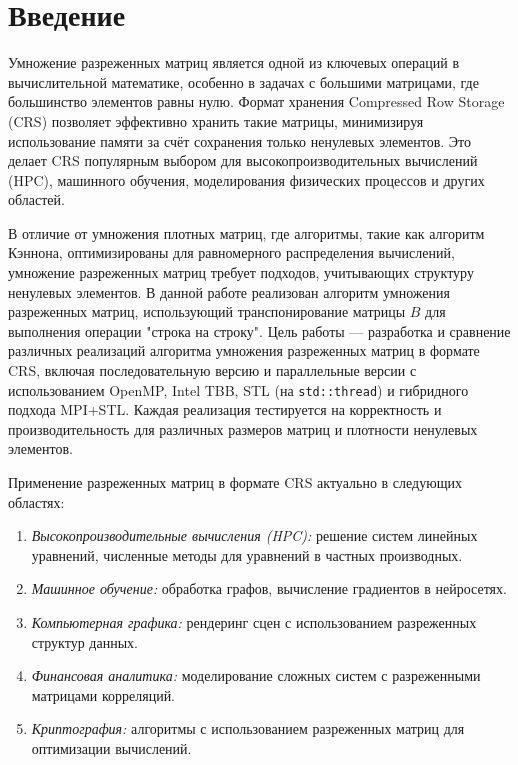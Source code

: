 \documentclass[a4paper,12pt]{article}
\begin{document}
\tableofcontents
\newpage

\section{Введение}
Умножение разреженных матриц является одной из ключевых операций в вычислительной математике, особенно в задачах с большими матрицами, где большинство элементов равны нулю. Формат хранения Compressed Row Storage (CRS) позволяет эффективно хранить такие матрицы, минимизируя использование памяти за счёт сохранения только ненулевых элементов. Это делает CRS популярным выбором для высокопроизводительных вычислений (HPC), машинного обучения, моделирования физических процессов и других областей.

В отличие от умножения плотных матриц, где алгоритмы, такие как алгоритм Кэннона, оптимизированы для равномерного распределения вычислений, умножение разреженных матриц требует подходов, учитывающих структуру ненулевых элементов. В данной работе реализован алгоритм умножения разреженных матриц, использующий транспонирование матрицы \( B \) для выполнения операции "строка на строку". Цель работы — разработка и сравнение различных реализаций алгоритма умножения разреженных матриц в формате CRS, включая последовательную версию и параллельные версии с использованием OpenMP, Intel TBB, STL (на \texttt{std::thread}) и гибридного подхода MPI+STL. Каждая реализация тестируется на корректность и производительность для различных размеров матриц и плотности ненулевых элементов.

Применение разреженных матриц в формате CRS актуально в следующих областях:
\begin{enumerate}
    \item \textit{Высокопроизводительные вычисления (HPC):} решение систем линейных уравнений, численные методы для уравнений в частных производных.
    \item \textit{Машинное обучение:} обработка графов, вычисление градиентов в нейросетях.
    \item \textit{Компьютерная графика:} рендеринг сцен с использованием разреженных структур данных.
    \item \textit{Финансовая аналитика:} моделирование сложных систем с разреженными матрицами корреляций.
    \item \textit{Криптография:} алгоритмы с использованием разреженных матриц для оптимизации вычислений.
\end{enumerate}
\end{document}

